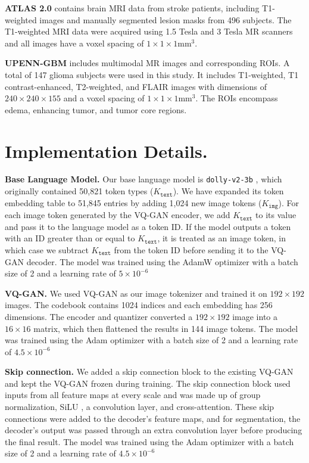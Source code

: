 \vspace{3pt}
\noindent \textbf{ATLAS 2.0} \cite{liew2022large} contains brain MRI data from stroke patients, including T1-weighted images and manually segmented lesion masks from 496 subjects. The T1-weighted MRI data were acquired using 1.5 Tesla and 3 Tesla MR scanners and all images have a voxel spacing of $1\times1\times1 \text{mm}^3$.

\vspace{3pt}
\noindent \textbf{UPENN-GBM} \cite{bakas2021multi} includes multimodal MR images and corresponding ROIs. A total of 147 glioma subjects were used in this study. It includes T1-weighted, T1 contrast-enhanced, T2-weighted, and FLAIR images with dimensions of $240\times240\times155$ and a voxel spacing of $1\times1\times1 \text{mm}^3$. The ROIs encompass edema, enhancing tumor, and tumor core regions.

\section{Implementation Details.}
\label{sec:B}

\noindent \textbf{Base Language Model.} Our base language model is \texttt{dolly-v2-3b} \cite{dolly2023introducing}, which originally contained 50,821 token types ($K_\texttt{text}$). We have expanded its token embedding table to 51,845 entries by adding 1,024 new image tokens ($K_\texttt{img}$). For each image token generated by the VQ-GAN \cite{esser2021taming} encoder, we add $K_\texttt{text}$ to its value and pass it to the language model as a token ID. If the model outputs a token with an ID greater than or equal to $K_\texttt{text}$, it is treated as an image token, in which case we subtract $K_\texttt{text}$ from the token ID before sending it to the VQ-GAN decoder. The model was trained using the AdamW \cite{loshchilov2018decoupled} optimizer with a batch size of 2 and a learning rate of $5\times10^{-6}$

\vspace{3pt}
\noindent \textbf{VQ-GAN.} We used VQ-GAN as our image tokenizer and trained it on $192\times192$ images. The codebook contains 1024 indices and each embedding has 256 dimensions. The encoder and quantizer converted a $192\times192$ image into a $16\times16$ matrix, which then flattened the results in 144 image tokens. The model was trained using the Adam \cite{KingmaB14} optimizer with a batch size of 2 and a learning rate of $4.5\times10^{-6}$

\vspace{3pt}
\noindent \textbf{Skip connection.} We added a skip connection block to the existing VQ-GAN and kept the VQ-GAN frozen during training. The skip connection block used inputs from all feature maps at every scale and was made up of group normalization, SiLU \cite{elfwing2018sigmoid}, a convolution layer, and cross-attention. These skip connections were added to the decoder’s feature maps, and for segmentation, the decoder’s output was passed through an extra convolution layer before producing the final result. The model was trained using the Adam optimizer with a batch size of 2 and a learning rate of $4.5\times10^{-6}$

